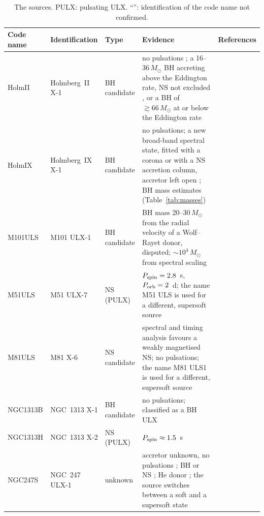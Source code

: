 \begin{table}
\centering
\caption{The sources. PULX: pulsating ULX. ``\idq'': identification of the code name not confirmed.}
\label{tab:sources}
\footnotesize
\begin{tabular}{@{}lp{}p{}p{}p{}@{}}
\toprule
Code name & Identification & Type & Evidence & References \\
\midrule
HolmII & Holmberg~II X-1 & BH candidate & no pulsations \citep{ReyeroSerantes2024}; a 16--36\,$M_\odot$ BH accreting above the Eddington rate, NS not excluded \citep{Barra2024}, or a BH of $\gtrsim 66\,M_\odot$ at or below the Eddington rate \citep{ReyeroSerantes2024} & \citealt{Barra2024, ReyeroSerantes2024} \\
HolmIX & Holmberg~IX X-1 & BH candidate & no pulsations; a new broad-band spectral state, fitted with a corona or with a NS accretion column, accretor left open \citep{Walton2025}; BH mass estimates (Table~\ref{tab:masses}) & \citealt{Walton2025, Gill2021} \\
M101ULS & M101 ULX-1 & BH candidate & BH mass 20--30\,$M_\odot$ from the radial velocity of a Wolf--Rayet donor, disputed; ${\sim}10^4\,M_\odot$ from spectral scaling & \citealt{Liu2013, Titarchuk2016} \\
M51ULS & M51 ULX-7\idq{} & NS (PULX) & $P_{\rm spin} = 2.8$~s, $P_{\rm orb} = 2$~d; the name M51 ULS is used for a different, supersoft source \citep{Earnshaw2017, DiStefano2021} & \citealt{RodriguezCastillo2020} \\
M81ULS & M81 X-6\idq{} & NS candidate & spectral and timing analysis favours a weakly magnetised NS; no pulsations; the name M81 ULS1 is used for a different, supersoft source \citep{LiuDiStefano2008, Liu2015} & \citealt{Amato2023} \\
NGC1313B & NGC~1313 X-1\idq{} & BH candidate & no pulsations; classified as a BH ULX & \citealt{Majumder2023, Majumder2025} \\
NGC1313H & NGC~1313 X-2\idq{} & NS (PULX) & $P_{\rm spin} \approx 1.5$~s & \citealt{Sathyaprakash2019} \\
NGC247S & NGC~247 ULX-1 & unknown & accretor unknown, no pulsations \citep{DAi2021}; BH or NS \citep{Pinto2021}; He donor \citep{Zhou2023}; the source switches between a soft and a supersoft state \citep{DAi2021} & \citealt{Pinto2021, DAi2021, Zhou2023} \\

\end{tabular}
\end{table}
